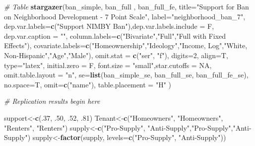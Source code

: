 \documentclass[]{article}
\newenvironment{Shaded}{\begin{snugshade}}{\end{snugshade}}
\newcommand{\CommentTok}[1]{\textcolor[rgb]{0.56,0.35,0.01}{\textit{#1}}}
\newcommand{\DataTypeTok}[1]{\textcolor[rgb]{0.13,0.29,0.53}{#1}}
\newcommand{\DecValTok}[1]{\textcolor[rgb]{0.00,0.00,0.81}{#1}}
\newcommand{\FloatTok}[1]{\textcolor[rgb]{0.00,0.00,0.81}{#1}}
\newcommand{\KeywordTok}[1]{\textcolor[rgb]{0.13,0.29,0.53}{\textbf{#1}}}
\newcommand{\NormalTok}[1]{#1}
\newcommand{\OtherTok}[1]{\textcolor[rgb]{0.56,0.35,0.01}{#1}}
\newcommand{\StringTok}[1]{\textcolor[rgb]{0.31,0.60,0.02}{#1}}
\begin{document}
\begin{Shaded}
\begin{Highlighting}[]
{\CommentTok{# Table}
\KeywordTok{stargazer}\NormalTok{(ban_simple,  ban_full , ban_full_fe, }\DataTypeTok{title=}\StringTok{"Support for Ban on Neighborhood Development - 7 Point Scale"}\NormalTok{, }\DataTypeTok{label=}\StringTok{"neighborhood_ban_7"}\NormalTok{,}
          \DataTypeTok{dep.var.labels=}\KeywordTok{c}\NormalTok{(}\StringTok{"Support NIMBY Ban"}\NormalTok{),}\DataTypeTok{dep.var.labels.include =}\NormalTok{ F, }\DataTypeTok{dep.var.caption =} \StringTok{""}\NormalTok{,}
          \DataTypeTok{column.labels=}\KeywordTok{c}\NormalTok{(}\StringTok{"Bivariate"}\NormalTok{,}\StringTok{"Full"}\NormalTok{,}\StringTok{"Full with Fixed Effects"}\NormalTok{),}
          \DataTypeTok{covariate.labels=}\KeywordTok{c}\NormalTok{(}\StringTok{"Homeownership"}\NormalTok{,}\StringTok{"Ideology"}\NormalTok{,}\StringTok{"Income, Log"}\NormalTok{,}\StringTok{"White, Non-Hispanic"}\NormalTok{,}\StringTok{"Age"}\NormalTok{,}\StringTok{"Male"}\NormalTok{),}
          \DataTypeTok{omit.stat =} \KeywordTok{c}\NormalTok{(}\StringTok{"ser"}\NormalTok{, }\StringTok{"f"}\NormalTok{), }\DataTypeTok{digits=}\DecValTok{2}\NormalTok{, }\DataTypeTok{align=}\NormalTok{T, }\DataTypeTok{type=}\StringTok{"latex"}\NormalTok{,}
          \DataTypeTok{initial.zero =}\NormalTok{ F,  }\DataTypeTok{font.size =} \StringTok{"small"}\NormalTok{,}\DataTypeTok{star.cutoffs =} \OtherTok{NA}\NormalTok{, }\DataTypeTok{omit.table.layout =} \StringTok{"n"}\NormalTok{,}
          \DataTypeTok{se=}\KeywordTok{list}\NormalTok{(ban_simple_se, ban_full_se, ban_full_fe_se), }\DataTypeTok{no.space=}\NormalTok{T, }\DataTypeTok{omit=}\KeywordTok{c}\NormalTok{(}\StringTok{"name"}\NormalTok{), }\DataTypeTok{table.placement =} \StringTok{"H"}\NormalTok{ )}

\CommentTok{# Replication results begin here}

\NormalTok{support<-}\KeywordTok{c}\NormalTok{(.}\DecValTok{37}\NormalTok{, }\FloatTok{.50}\NormalTok{, }\FloatTok{.52}\NormalTok{, }\FloatTok{.81}\NormalTok{)}
\NormalTok{Tenant<-}\KeywordTok{c}\NormalTok{(}\StringTok{"Homeowners"}\NormalTok{, }\StringTok{"Homeowners"}\NormalTok{, }\StringTok{"Renters"}\NormalTok{, }\StringTok{"Renters"}\NormalTok{)}
\NormalTok{supply<-}\KeywordTok{c}\NormalTok{(}\StringTok{"Pro-Supply"}\NormalTok{, }\StringTok{"Anti-Supply"}\NormalTok{,}\StringTok{"Pro-Supply"}\NormalTok{,}\StringTok{"Anti-Supply"}\NormalTok{)}
\NormalTok{supply<-}\KeywordTok{factor}\NormalTok{(supply, }\DataTypeTok{levels=}\KeywordTok{c}\NormalTok{(}\StringTok{"Pro-Supply"}\NormalTok{, }\StringTok{"Anti-Supply"}\NormalTok{))}

}
\end{Highlighting}
\end{Shaded}
\end{document}
